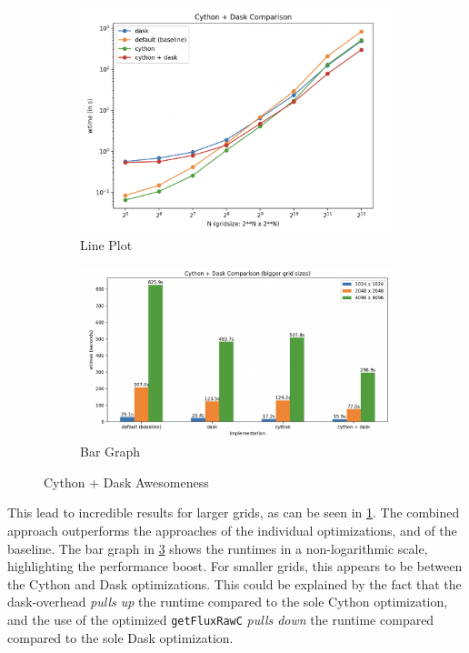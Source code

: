 \documentclass[a4paper,10pt]{article}
\begin{document}
\begin{figure}[h]
     \centering
     \begin{subfigure}[b]{0.45\textwidth}
        \centering
        \includegraphics[width=\linewidth]{images/cython_dask/cython_dask_final_plot.png}
        \caption{Line Plot}
        \label{fig:cython_dask_final_plot}
     \end{subfigure}
     \hfill
     \begin{subfigure}[b]{0.45\textwidth}
        \centering
        \includegraphics[width=\linewidth]{images/cython_dask/cython_dask_final_bar.png}
        \caption{Bar Graph}
        \label{fig:cython_dask_final_bar}
     \end{subfigure}
  \caption{Cython + Dask Awesomeness}
\end{figure}

This lead to incredible results for larger grids, as can be seen in \ref{fig:cython_dask_final_plot}.
The combined approach outperforms the approaches of the individual optimizations, and of the baseline.
The bar graph in \ref{fig:cython_dask_final_bar} shows the runtimes in a non-logarithmic scale, highlighting the performance boost.
For smaller grids, this appears to be between the Cython and Dask optimizations.
This could be explained by the fact that the dask-overhead \textit{pulls up} the runtime compared to the sole Cython optimization, and the use of the optimized \verb|getFluxRawC| \textit{pulls down} the runtime compared compared to the sole Dask optimization.
\end{document}
